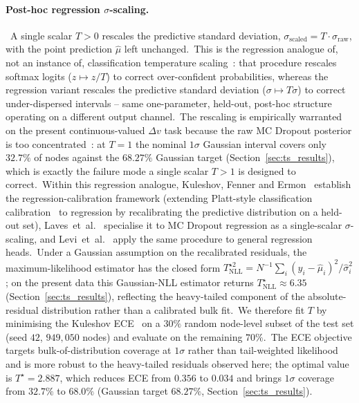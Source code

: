 \paragraph{Post-hoc regression \texorpdfstring{$\sigma$}{σ}-scaling.}\ A single scalar $T > 0$ rescales the predictive standard deviation, $\sigma_\text{scaled} = T \cdot \sigma_\text{raw}$, with the point prediction $\hat\mu$ left unchanged.\ This is the regression analogue of, not an instance of, classification temperature scaling~\cite{guo2017calibration}: that procedure rescales softmax logits ($z \mapsto z/T$) to correct over-confident probabilities, whereas the regression variant rescales the predictive standard deviation ($\sigma \mapsto T\sigma$) to correct under-dispersed intervals -- same one-parameter, held-out, post-hoc structure operating on a different output channel.\ The rescaling is empirically warranted on the present continuous-valued $\Delta v$ task because the raw MC Dropout posterior is too concentrated~\cite{foong2019between}: at $T = 1$ the nominal $1\sigma$ Gaussian interval covers only $32.7\%$ of nodes against the $68.27\%$ Gaussian target (Section~\ref{sec:ts_results}), which is exactly the failure mode a single scalar $T > 1$ is designed to correct.\ Within this regression analogue, Kuleshov, Fenner and Ermon~\cite{kuleshov2018accurate} establish the regression-calibration framework (extending Platt-style classification calibration~\cite{guo2017calibration} to regression by recalibrating the predictive distribution on a held-out set), Laves~et~al.~\cite{laves2020wellcal,laves2019temperature} specialise it to MC Dropout regression as a single-scalar $\sigma$-scaling, and Levi~et~al.~\cite{levi2022evaluating} apply the same procedure to general regression heads.\ Under a Gaussian assumption on the recalibrated residuals, the maximum-likelihood estimator has the closed form $T^{\star 2}_\text{NLL} = N^{-1}\sum_i (y_i - \hat\mu_i)^2 / \hat\sigma_i^2$; on the present data this Gaussian-NLL estimator returns $T^\star_\text{NLL} \approx 6.35$ (Section~\ref{sec:ts_results}), reflecting the heavy-tailed component of the absolute-residual distribution rather than a calibrated bulk fit.\ We therefore fit $T$ by minimising the Kuleshov ECE~\cite{kuleshov2018accurate} on a $30\%$ random node-level subset of the test set (seed $42$, $949{,}050$ nodes) and evaluate on the remaining $70\%$.\ The ECE objective targets bulk-of-distribution coverage at $1\sigma$ rather than tail-weighted likelihood and is more robust to the heavy-tailed residuals observed here; the optimal value is $T^\star = 2.887$, which reduces ECE from $0.356$ to $0.034$ and brings $1\sigma$ coverage from $32.7\%$ to $68.0\%$ (Gaussian target $68.27\%$, Section~\ref{sec:ts_results}).

